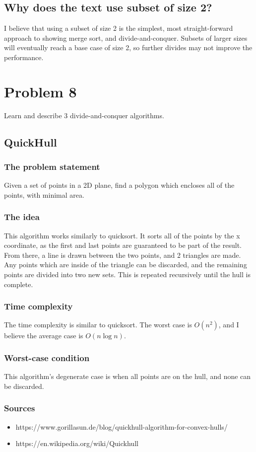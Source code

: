 \documentclass{article}
\begin{document}
\subsection{Why does the text use subset of size 2?}
I believe that using a subset of size 2 is the simplest, most straight-forward approach to showing merge sort, and divide-and-conquer.
Subsets of larger sizes will eventually reach a base case of size 2, so further divides may not improve the performance.

\section{Problem 8}
\begin{em}
Learn and describe 3 divide-and-conquer algorithms.
\end{em}
\subsection{QuickHull}
\subsubsection{The problem statement}
Given a set of points in a 2D plane, find a polygon which encloses all of the points, with minimal area.
\subsubsection{The idea}
This algorithm works similarly to quicksort.
It sorts all of the points by the x coordinate, as the first and last points are guaranteed to be part of the result.
From there, a line is drawn between the two points, and 2 triangles are made.
Any points which are inside of the triangle can be discarded, and the remaining points are divided into two new sets.
This is repeated recursively until the hull is complete.
\subsubsection{Time complexity}
The time complexity is similar to quicksort. The worst case is \(O(n^2)\), and I believe the average case is \(O(n \log n)\).
\subsubsection{Worst-case condition}
This algorithm's degenerate case is when all points are on the hull, and none can be discarded.
\subsubsection{Sources}
\begin{itemize}
    \item https://www.gorillasun.de/blog/quickhull-algorithm-for-convex-hulls/
    \item https://en.wikipedia.org/wiki/Quickhull
\end{itemize}
\end{document}
